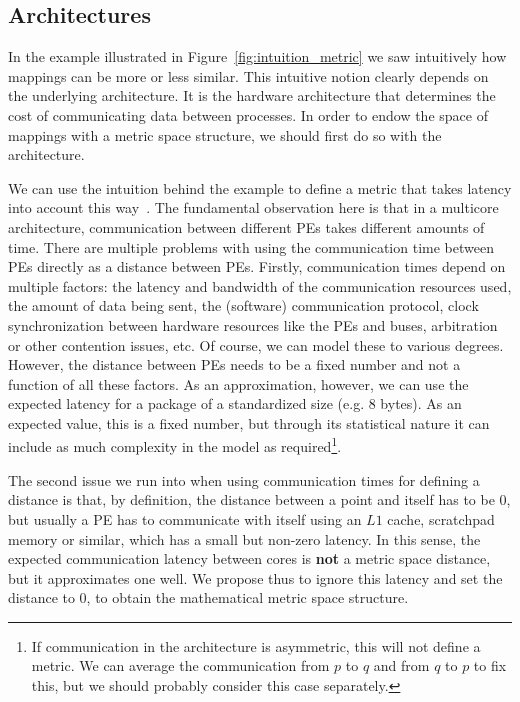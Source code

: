 \subsection{Architectures}

In the example illustrated in Figure~\ref{fig:intuition_metric} we saw intuitively how mappings can be more or less similar.
This intuitive notion clearly depends on the underlying architecture.
It is the hardware architecture that determines the cost of communicating data between processes.
In order to endow the space of mappings with a metric space structure, we should first do so with the architecture.

We can use the intuition behind the example to define a metric that takes latency into account this way~\cite{goens_mcsoc18}.
The fundamental observation here is that in a multicore architecture, communication between different \acp{PE} takes different amounts of time.
There are multiple problems with using the communication time between \acp{PE} directly as a distance between \acp{PE}.
Firstly, communication times depend on multiple factors: the latency and bandwidth of the communication resources used, the amount of data being sent, the (software) communication protocol, clock synchronization between hardware resources like the \acp{PE} and buses, arbitration or other contention issues, etc.
Of course, we can model these to various degrees.
However, the distance between \acp{PE} needs to be a fixed number and not a function of all these factors.
As an approximation, however, we can use the expected latency for a package of a standardized size (e.g. $8$ bytes).
As an expected value, this is a fixed number, but through its statistical nature it can include as much complexity in the model as required\footnote{If communication in the architecture is asymmetric, this will not define a metric. We can average the communication from $p$ to $q$ and from $q$ to $p$ to fix this, but we should probably consider this case separately.}.

The second issue we run into when using communication times for defining a distance is that, by definition, the distance between a point and itself has to be $0$, but usually a PE has to communicate with itself using an $L1$ cache, scratchpad memory or similar, which has a small but non-zero latency. In this sense, the expected communication latency between cores is \textbf{not} a metric space distance, but it approximates one well. We propose thus to ignore this latency and set the distance to 0, to obtain the mathematical metric space structure. 

